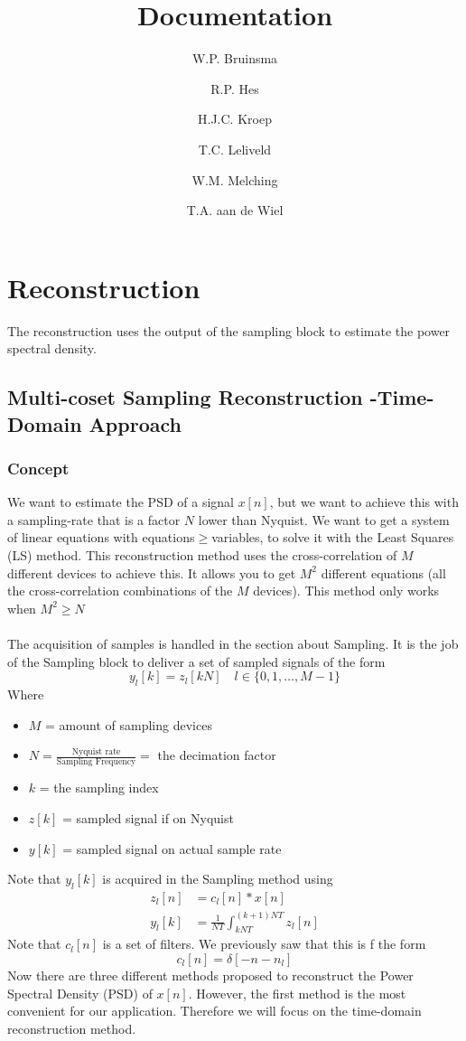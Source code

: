 \documentclass[report, oneside, a4paper, openany]{memoir}
\title{Documentation}
\author{W.P. Bruinsma \and R.P. Hes \and H.J.C. Kroep \and T.C. Leliveld \and W.M. Melching \and T.A. aan de Wiel}
\begin{document}
\chapter{Reconstruction}
The reconstruction uses the output of the sampling block to estimate the power spectral density.

\section{Multi-coset Sampling Reconstruction -Time-Domain Approach}
\subsection{Concept}
We want to estimate the PSD of a signal $x[n]$, but we want to achieve this with a sampling-rate that is a factor $N$ lower than Nyquist. 
We want to get a system of linear equations with equations$\geq$variables, to solve it with the Least Squares (LS) method. 
This reconstruction method uses the cross-correlation of $M$ different devices to achieve this. 
It allows you to get $M^2$ different equations (all the cross-correlation combinations of the $M$ devices). This method only works when $M^2\geq N$\\
\\
The acquisition of samples is handled in the section about Sampling. It is the job of the Sampling block to deliver a set of sampled signals of the form 
$$y_l[k] = z_l[kN] \quad l \in \{0,1,\dots, M-1\}$$
Where
\begin{itemize}
\item $M$  = amount of sampling devices
\item $N = \frac{\text{Nyquist rate}}{\text{Sampling Frequency}} = $ the decimation factor
\item $k$ = the sampling index
\item $z[k]$ = sampled signal if on Nyquist
\item $y[k]$ = sampled signal on actual sample rate
\end{itemize}

Note that $y_l[k]$ is acquired in the Sampling method using
\begin{equation*}
\begin{split}
z_l[n] &= c_l[n]\ast x[n]\\
y_l[k] &= \frac{1}{NT}\int_{kNT}^{(k+1)NT} z_l[n]
\end{split}
\end{equation*}
Note that $c_l[n]$ is a set of filters. We previously saw that this is f the form 
$$
c_l[n] = \delta[-n -n_l]
$$
Now there are three different methods proposed to reconstruct the Power Spectral Density (PSD) of $x[n]$. 
However, the first method is the most convenient for our application. 
Therefore we will focus on the time-domain reconstruction method.
\end{document}
